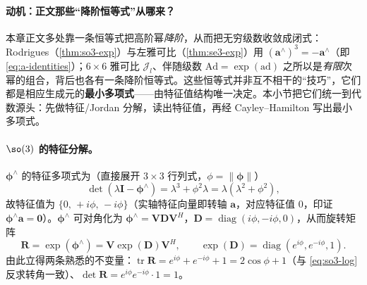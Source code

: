 \paragraph{动机：正文那些“降阶恒等式”从哪来？}本章正文多处靠一条恒等式把高阶幂\emph{降阶}，从而把无穷级数收敛成闭式：Rodrigues（\cref{thm:so3-exp}）与左雅可比（\cref{thm:se3-exp}）用 $(\mathbf{a}^\wedge)^3=-\mathbf{a}^\wedge$（即 \cref{eq:a-identities}）；$6\times6$ 雅可比 $\boldsymbol{\mathcal{J}}_l$、伴随级数 $\mathrm{Ad}=\exp(\mathrm{ad})$ 之所以是\emph{有限}次幂的组合，背后也各有一条降阶恒等式。这些恒等式并非互不相干的“技巧”，它们都是相应生成元的\textbf{最小多项式}——由特征值结构唯一决定。本小节把它们统一到代数源头：先做特征/Jordan 分解，读出特征值，再经 Cayley--Hamilton 写出最小多项式。

\paragraph{$\so(3)$ 的特征分解。}$\boldsymbol{\phi}^\wedge$ 的特征多项式为（直接展开 $3\times3$ 行列式，$\phi=\|\boldsymbol{\phi}\|$）
\begin{equation}
  \det(\lambda\mathbf{I}-\boldsymbol{\phi}^\wedge)=\lambda^3+\phi^2\lambda=\lambda(\lambda^2+\phi^2),
  \label{eq:so3-charpoly}
\end{equation}
故特征值为 $\{0,\,+i\phi,\,-i\phi\}$（实轴特征向量即转轴 $\mathbf{a}$，对应特征值 $0$，印证 $\boldsymbol{\phi}^\wedge\mathbf{a}=\mathbf{0}$）。$\boldsymbol{\phi}^\wedge$ 可对角化为 $\boldsymbol{\phi}^\wedge=\mathbf{V}\mathbf{D}\mathbf{V}^{H}$，$\mathbf{D}=\operatorname{diag}(i\phi,-i\phi,0)$，从而旋转矩阵
\begin{equation}
  \mathbf{R}=\exp(\boldsymbol{\phi}^\wedge)=\mathbf{V}\exp(\mathbf{D})\mathbf{V}^{H},\qquad
  \exp(\mathbf{D})=\operatorname{diag}(e^{i\phi},e^{-i\phi},1).
  \label{eq:so3-eigen}
\end{equation}
由此立得两条熟悉的不变量：$\operatorname{tr}\mathbf{R}=e^{i\phi}+e^{-i\phi}+1=2\cos\phi+1$（与 \cref{eq:so3-log} 反求转角一致）、$\det\mathbf{R}=e^{i\phi}e^{-i\phi}\cdot1=1$。

